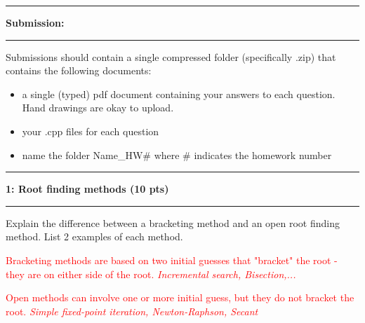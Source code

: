 \documentclass[11pt]{article}
\newcommand\question[2]{\vspace{.25in}\hrule\textbf{#1: #2}\vspace{.5em}\hrule\vspace{.10in}}
\begin{document}
\raggedright
\newcommand\Page{\page  / \lastPage}
\newcommand\page{1}
\newcommand\qN[2]{\Large {#1} \small{#2} \normalsize}

\newcommand\dueDate{\today}
\newcommand\hwnum{3}
\newcommand\ExNum{}

\newcommand\lastPage{3}

\lhead{\large Homework \hwnum }
\rhead{\rightHead}
\newcommand\rightHead{\large Due October 2, 2020}

\question{Submission}{}
Submissions should contain a single compressed folder (specifically .zip) that contains the following documents:
\begin{itemize}
	\item a single (typed) pdf document containing your answers to each question. Hand drawings are okay to upload.\\
	\item your .cpp files for each question\\
	\item name the folder Name\_HW\# where \# indicates the homework number\\
\end{itemize}

\vspace{5cm}
\question{1}{Root finding methods (10 pts)}
Explain the difference between a bracketing method and an open root finding method. List 2 examples of each method. \\\vspace{1cm}

\textcolor{red}{Bracketing methods are based on two initial guesses that
"bracket" the root - they are on either side of the root. \textit{Incremental search, Bisection,...}}\\\vspace{0.5cm}

\textcolor{red}{Open methods can involve one or more initial guess, but they
do not bracket the root. \textit{Simple fixed-point iteration, Newton-Raphson, Secant}}
\vspace{2cm}
\end{document}
